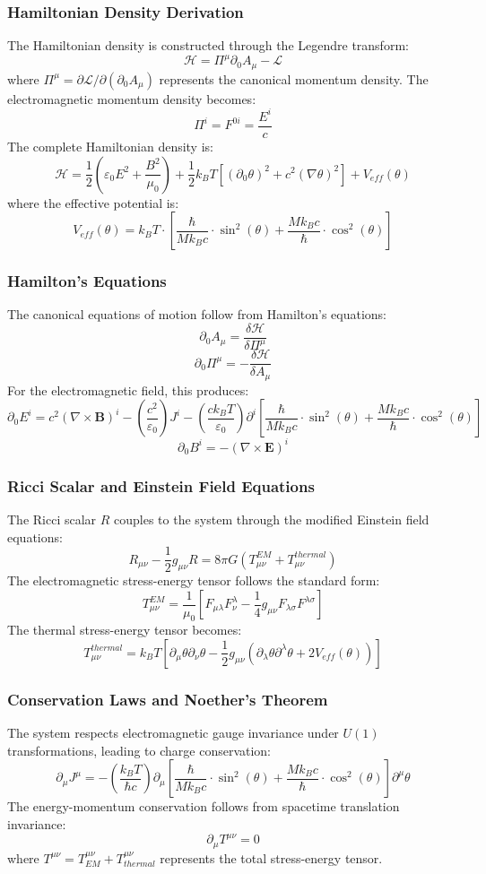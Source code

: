 ﻿\documentclass[12pt]{article}
\begin{document}
\subsubsection{Hamiltonian Density Derivation}
The Hamiltonian density is constructed through the Legendre transform:
$$\mathcal{H} = \Pi^\mu\partial_0 A_\mu - \mathcal{L}$$
where $\Pi^\mu = \partial\mathcal{L}/\partial(\partial_0 A_\mu)$ represents the canonical momentum density.
The electromagnetic momentum density becomes:
$$\Pi^i = F^{0i} = \frac{E^i}{c}$$
The complete Hamiltonian density is:
$$\mathcal{H} = \frac{1}{2}\left(\varepsilon_0 E^2 + \frac{B^2}{\mu_0}\right) + \frac{1}{2}k_B T[(\partial_0\theta)^2 + c^2(\nabla\theta)^2] + V_{eff}(\theta)$$
where the effective potential is:
$$V_{eff}(\theta) = k_B T \cdot \left[\frac{\hbar}{Mk_Bc}\cdot\sin^2(\theta) + \frac{Mk_Bc}{\hbar}\cdot\cos^2(\theta)\right]$$

\subsubsection{Hamilton's Equations}
The canonical equations of motion follow from Hamilton's equations:
$$\partial_0 A_\mu = \frac{\delta\mathcal{H}}{\delta\Pi^\mu}$$
$$\partial_0\Pi^\mu = -\frac{\delta\mathcal{H}}{\delta A_\mu}$$
For the electromagnetic field, this produces:
$$\partial_0 E^i = c^2(\nabla\times\mathbf{B})^i - \left(\frac{c^2}{\varepsilon_0}\right)J^i - \left(\frac{ck_B T}{\varepsilon_0}\right)\partial^i\left[\frac{\hbar}{Mk_Bc}\cdot\sin^2(\theta) + \frac{Mk_Bc}{\hbar}\cdot\cos^2(\theta)\right]$$
$$\partial_0 B^i = -(\nabla\times\mathbf{E})^i$$

\subsubsection{Ricci Scalar and Einstein Field Equations}
The Ricci scalar $R$ couples to the system through the modified Einstein field equations:
$$R_{\mu\nu} - \frac{1}{2}g_{\mu\nu}R = 8\pi G(T_{\mu\nu}^{EM} + T_{\mu\nu}^{thermal})$$
The electromagnetic stress-energy tensor follows the standard form:
$$T_{\mu\nu}^{EM} = \frac{1}{\mu_0}\left[F_{\mu\lambda}F_\nu^\lambda - \frac{1}{4}g_{\mu\nu}F_{\lambda\sigma}F^{\lambda\sigma}\right]$$
The thermal stress-energy tensor becomes:
$$T_{\mu\nu}^{thermal} = k_B T\left[\partial_\mu\theta\partial_\nu\theta - \frac{1}{2}g_{\mu\nu}(\partial_\lambda\theta\partial^\lambda\theta + 2V_{eff}(\theta))\right]$$

\subsubsection{Conservation Laws and Noether's Theorem}
The system respects electromagnetic gauge invariance under $U(1)$ transformations, leading to charge conservation:
$$\partial_\mu J^\mu = -\left(\frac{k_B T}{\hbar c}\right)\partial_\mu\left[\frac{\hbar}{Mk_Bc}\cdot\sin^2(\theta) + \frac{Mk_Bc}{\hbar}\cdot\cos^2(\theta)\right]\partial^\mu\theta$$
The energy-momentum conservation follows from spacetime translation invariance:
$$\partial_\mu T^{\mu\nu} = 0$$
where $T^{\mu\nu} = T^{\mu\nu}_{EM} + T^{\mu\nu}_{thermal}$ represents the total stress-energy tensor.
\end{document}
